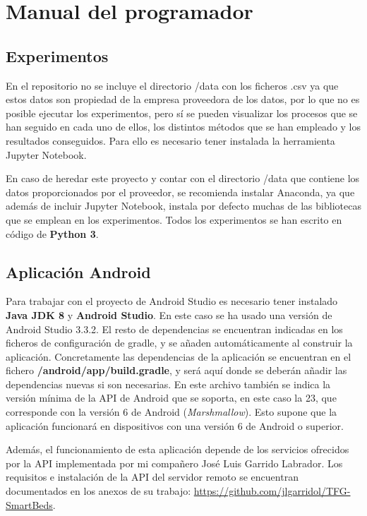 \section{Manual del programador}

\subsection{Experimentos} 

En el repositorio no se incluye el directorio /data con los ficheros .csv ya que estos datos son propiedad de la empresa proveedora de los datos, por lo que no es posible ejecutar los experimentos, pero sí se pueden visualizar los procesos que se han seguido en cada uno de ellos, los distintos métodos que se han empleado y los resultados conseguidos. Para ello es necesario tener instalada la herramienta Jupyter Notebook. 

En caso de heredar este proyecto y contar con el directorio /data que contiene los datos proporcionados por el proveedor, se recomienda instalar Anaconda, ya que además de incluir Jupyter Notebook, instala por defecto muchas de las bibliotecas que se emplean en los experimentos. Todos los experimentos se han escrito en código de \textbf{Python 3}. 

\subsection{Aplicación Android}

Para trabajar con el proyecto de Android Studio es necesario tener instalado \textbf{Java JDK 8} y \textbf{Android Studio}. En este caso se ha usado una versión de Android Studio 3.3.2. El resto de dependencias se encuentran indicadas en los ficheros de configuración de gradle, y se añaden automáticamente al construir la aplicación. Concretamente las dependencias de la aplicación se encuentran en el fichero \textbf{/android/app/build.gradle}, y será aquí donde se deberán añadir las dependencias nuevas si son necesarias. En este archivo también se indica la versión mínima de la API de Android que se soporta, en este caso la 23, que corresponde con la versión 6 de Android (\textit{Marshmallow}). Esto supone que la aplicación funcionará en dispositivos con una versión 6 de Android o superior. 

Además, el funcionamiento de esta aplicación depende de los servicios ofrecidos por la API implementada por mi compañero José Luis Garrido Labrador. Los requisitos e instalación de la API del servidor remoto se encuentran documentados en los anexos de su trabajo: \url{https://github.com/jlgarridol/TFG-SmartBeds}.

